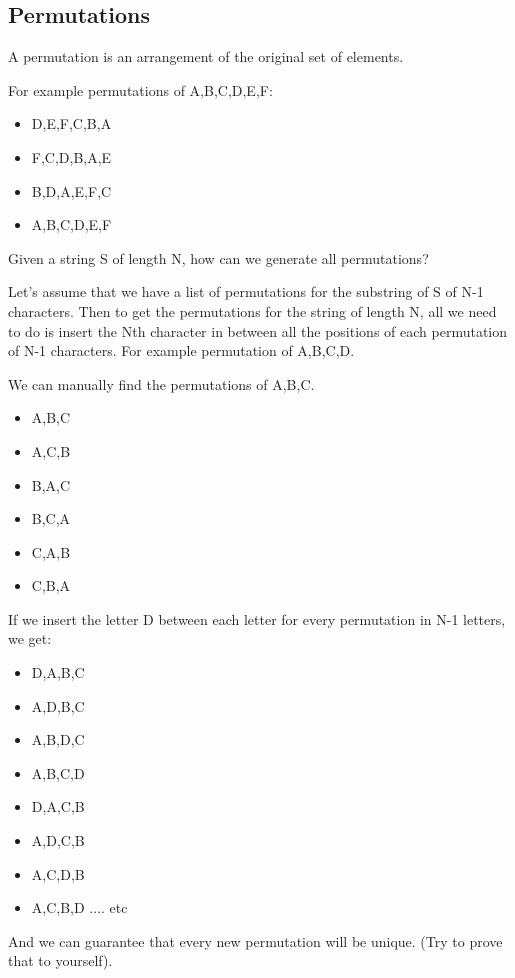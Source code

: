 \documentclass[11pt,oneside]{book}
\begin{document}
\subsection{Permutations}

A permutation is an arrangement of the original set of elements.

For example permutations of A,B,C,D,E,F:

\begin{itemize}
\item D,E,F,C,B,A
\item F,C,D,B,A,E
\item B,D,A,E,F,C
\item A,B,C,D,E,F
\end{itemize}

Given a string S of length N, how can we generate all permutations?

Let's assume that we have a list of permutations for the substring of S of N-1 characters. Then to get the permutations for the string of length N, all we need to do is insert the Nth character in between all the positions of each permutation of N-1 characters. For example permutation of A,B,C,D.

We can manually find the permutations of A,B,C.

\begin{itemize}
\item A,B,C
\item A,C,B
\item B,A,C
\item B,C,A
\item C,A,B
\item C,B,A
\end{itemize}

If we insert the letter D between each letter for every permutation in N-1 letters, we get:

\begin{itemize}
\item D,A,B,C
\item A,D,B,C
\item A,B,D,C
\item A,B,C,D
\item D,A,C,B
\item A,D,C,B
\item A,C,D,B
\item A,C,B,D
.... etc
\end{itemize}

And we can guarantee that every new permutation will be unique. (Try to prove that to yourself).
\end{document}
